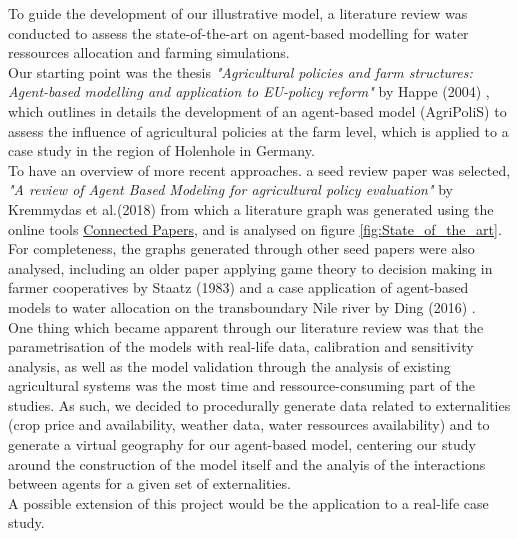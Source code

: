 \documentclass[a4paper,12pt]{article} %
\begin{document}
To guide the development of our illustrative model, a literature review was conducted to assess the state-of-the-art on agent-based modelling for water ressources allocation and farming simulations. \\
Our starting point was the thesis \textit{"Agricultural policies and farm structures: Agent-based modelling and application to EU-policy reform"} by Happe (2004) \cite{happeAgriculturalPoliciesFarm2004}, which outlines in details the development of an agent-based model (AgriPoliS) to assess the influence of agricultural policies at the farm level, which is applied to a case study in the region of Holenhole in Germany.\\
To have an overview of more recent approaches. a seed review paper was selected, \textit{"A review of Agent Based Modeling for agricultural policy evaluation"} by Kremmydas et al.(2018) \cite{kremmydasReviewAgentBased2018} from which a literature graph was generated using the online tools \href{https://www.connectedpapers.com/main/35fac7b643317e5f48f5280fadec94051bf2401f/A-review-of-Agent-Based-Modeling-for-agricultural-policy-evaluation/graph}{Connected Papers}, and is analysed on figure \ref{fig:State_of_the_art}.\\
For completeness, the graphs generated through other seed papers were also analysed, including an older paper applying game theory to decision making in farmer cooperatives by Staatz (1983) \cite{staatzGametheoreticAnalysisDecision1983} and a case application of agent-based models to water allocation on the transboundary Nile river by Ding (2016) \cite{dingAgentBasedModelling2016}.\\
One thing which became apparent through our literature review was that the parametrisation of the models with real-life data, calibration and sensitivity analysis, as well as the model validation through the analysis of existing agricultural systems was the most time and ressource-consuming part of the studies. As such, we decided to procedurally generate data related to externalities (crop price and availability, weather data, water ressources availability) and to generate a virtual geography for our agent-based model, centering our study around the construction of the model itself and the analyis of the interactions between agents for a given set of externalities.\\
A possible extension of this project would be the application to a real-life case study.
\end{document}
